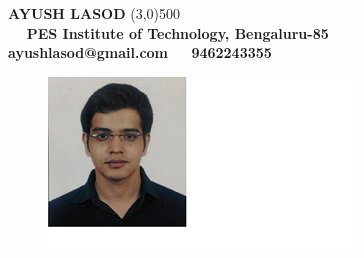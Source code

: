 \documentclass{article}
\begin{document}
	\begin{center}
		\vspace{10px}
	\textbf{\Huge AYUSH LASOD}
	\vspace{10px}
   \line(3,0){500} \\

~\textbullet~ \textbf{\normalsize PES Institute of Technology, Bengaluru-85} ~\textbullet~ {\textbf{\normalsize ayushlasod@gmail.com}} ~\textbullet~ \textbf{\normalsize 9462243355 }
    \vspace{5px}
    
    
\begin{figure}[h]
	\hspace{200pt}
\includegraphics{pic.jpg}
\end{figure}
\end{center}
\end{document}
